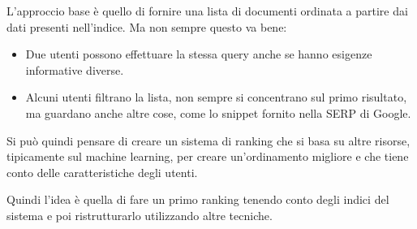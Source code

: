 L'approccio base è quello di fornire una lista di documenti ordinata a partire dai dati presenti nell'indice.
Ma non sempre questo va bene:
\begin{itemize}
\item Due utenti possono effettuare la stessa query anche se hanno esigenze informative diverse.
\item Alcuni utenti filtrano la lista, non sempre si concentrano sul primo risultato, ma guardano anche altre cose, come lo snippet fornito nella SERP di Google.
\end{itemize}

Si può quindi pensare di creare un sistema di ranking che si basa su altre risorse, tipicamente sul machine learning, per creare un'ordinamento migliore e che tiene conto delle caratteristiche degli utenti.

Quindi l'idea è quella di fare un primo ranking tenendo conto degli indici del sistema e poi ristrutturarlo utilizzando altre tecniche.
